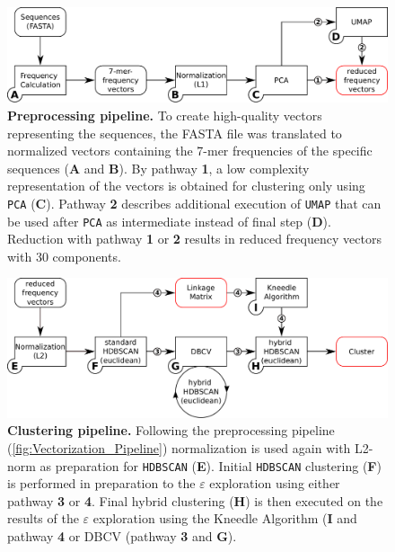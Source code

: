 \begin{figure}[!hbt]
    \centering
    \includegraphics[width=\textwidth]{Graphics/Vectorization.pdf}
    \caption[Preprocessing pipeline]{\textbf{Preprocessing pipeline.} To create high-quality vectors representing the sequences, the FASTA file was translated to normalized vectors containing the 7-mer frequencies of the specific sequences (\textsf{\textbf{A}} and \textsf{\textbf{B}}). By pathway \textsf{\textbf{1}}, a low complexity representation of the vectors is obtained for clustering only using \texttt{PCA} (\textsf{\textbf{C}}). Pathway \textsf{\textbf{2}} describes additional execution of \texttt{UMAP} that can be used after \texttt{PCA} as intermediate instead of final step (\textsf{\textbf{D}}). Reduction with pathway \textsf{\textbf{1}} or \textsf{\textbf{2}} results in reduced frequency vectors with 30 components.} 
    \label{fig:Vectorization_Pipeline}
\end{figure}

\begin{figure}[!hbt]
    \centering
    \includegraphics[width=\textwidth]{Graphics/Clustering.pdf}
    \caption[Clustering pipeline]{\textbf{Clustering pipeline.} Following the preprocessing pipeline (\autoref{fig:Vectorization_Pipeline}) normalization is used again with L2-norm as preparation for \texttt{HDBSCAN} (\textsf{\textbf{E}}). Initial \texttt{HDBSCAN} clustering (\textsf{\textbf{F}}) is performed in preparation to the $\varepsilon$ exploration using either pathway \textsf{\textbf{3}} or \textsf{\textbf{4}}. Final hybrid clustering (\textsf{\textbf{H}}) is then executed on the results of the $\varepsilon$ exploration using the Kneedle Algorithm (\textsf{\textbf{I}} and pathway \textsf{\textbf{4}} or DBCV (pathway \textsf{\textbf{3}} and \textsf{\textbf{G}}).}
    \label{fig:Clustering_Pipeline}
\end{figure}

